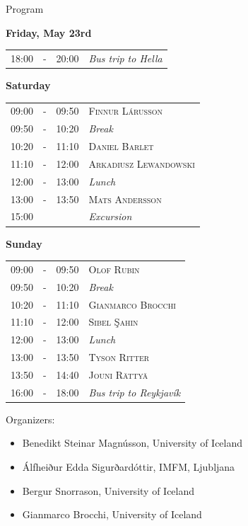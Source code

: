 \documentclass[12pt, openany, twoside]{report}      %
\begin{document}
\vfill


\pagebreak
\renewcommand{\arraystretch}{1.2}

\noindent
{\LARGE Program}

\bigskip
\bigskip
\noindent
\textbf{\large Friday, May 23rd}
\smallskip

\noindent
\begin{tabular}{l@{\ } l@{\ } l l}
18:00 & - & 20:00 & \textit{Bus trip to Hella}
\end{tabular}

\bigskip
\noindent
\textbf{\large Saturday}
\smallskip

\noindent
\begin{tabular}{l@{ } l@{ } l l}
09:00 & - & 09:50 & \textsc{Finnur Lárusson}
\\
09:50 & - & 10:20 & \textit{Break}
\\
10:20 & - & 11:10 & \textsc{Daniel Barlet}
\\
11:10 & - & 12:00 & \textsc{Arkadiusz Lewandowski}
\\
12:00 & - & 13:00 & \textit{Lunch}
\\
13:00 & - & 13:50 & \textsc{Mats Andersson}
\\
15:00 &  &  & \textit{Excursion}
\end{tabular}

\bigskip
\noindent
\textbf{\large Sunday}
\smallskip

\noindent
\begin{tabular}{l@{ } l@{ } l l}
09:00 & - & 09:50 & \textsc{Olof Rubin}
\\
09:50 & - & 10:20 & \textit{Break}
\\
10:20 & - & 11:10 & \textsc{Gianmarco Brocchi}
\\
11:10 & - & 12:00 & \textsc{Sibel Şahin}
\\
12:00 & - & 13:00 & \textit{Lunch}
\\
13:00 & - & 13:50 & \textsc{Tyson Ritter}
\\
13:50 & - & 14:40 & \textsc{Jouni Rättyä}
\\
16:00 & - & 18:00 & \textit{Bus trip to Reykjavík}
\end{tabular}

\vfill
\vfill
\noindent
Organizers:
\begin{itemize}
    \setlength\itemsep{-0.3 em}
    \item Benedikt Steinar Magnússon, University of Iceland
    \item Álfheiður Edda Sigurðardóttir, IMFM, Ljubljana
    \item Bergur Snorrason, University of Iceland
    \item Gianmarco Brocchi, University of Iceland
\end{itemize}
\vfill
\end{document}
